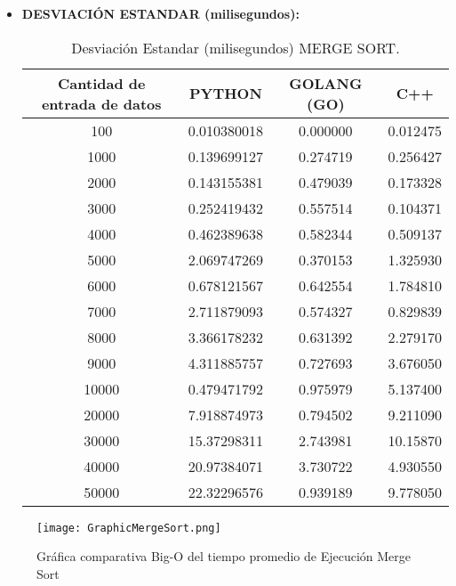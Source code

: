 \documentclass{article}
\begin{document}
\begin{itemize}
      \item \textbf{DESVIACIÓN ESTANDAR (milisegundos):}
        \begin{table}[H]
            \centering
            \begin{tabular}{||c c c c||} 
              \hline
              \textbf{Cantidad de entrada de datos} & \textbf{PYTHON} & \textbf{GOLANG (GO)} & \textbf{C++} \\ [0.5ex] 
              \hline\hline
              100    &  0.010380018  &  0.000000  &  0.012475  \\ [0.5ex]
              1000   &  0.139699127  &  0.274719  &  0.256427  \\ [0.5ex]
              2000   &  0.143155381  &  0.479039  &  0.173328  \\ [0.5ex]
              3000   &  0.252419432  &  0.557514  &  0.104371  \\ [0.5ex]
              4000   &  0.462389638  &  0.582344  &  0.509137  \\ [0.5ex]
              5000   &  2.069747269  &  0.370153  &  1.325930  \\ [0.5ex]
              6000   &  0.678121567  &  0.642554  &  1.784810  \\ [0.5ex]
              7000   &  2.711879093  &  0.574327  &  0.829839  \\ [0.5ex]
              8000   &  3.366178232  &  0.631392  &  2.279170  \\ [0.5ex]
              9000   &  4.311885757  &  0.727693  &  3.676050  \\ [0.5ex]
              10000  &  0.479471792  &  0.975979  &  5.137400  \\ [0.5ex]
              20000  &  7.918874973  &  0.794502  &  9.211090  \\ [0.5ex]
              30000  &  15.37298311  &  2.743981  &  10.15870  \\ [0.5ex]
              40000  &  20.97384071  &  3.730722  &  4.930550  \\ [0.5ex]
              50000  &  22.32296576  &  0.939189  &  9.778050  \\ [0.5ex]
              \hline
            \end{tabular}
            \caption{Desviación Estandar (milisegundos) MERGE SORT.}
            \label{table:desviacionEstandarMergeSort}
        \end{table}
    \end{itemize}

    \begin{figure}[H]
    \centering
    \texttt{[image: GraphicMergeSort.png]}
    \caption{\label{fig:bigOMergeSort}Gráfica comparativa Big-O del tiempo promedio de Ejecución Merge Sort}
    \end{figure}
\end{document}
